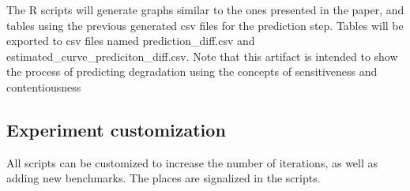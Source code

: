 \documentclass{sigplanconf}
\begin{document}
	The R scripts will generate graphs similar to the ones presented in the paper, and tables
	using the previous generated csv files for the prediction step. Tables will be exported to csv files named
	\textsf{prediction\_diff.csv} and \textsf{estimated\_curve\_prediciton\_diff.csv}.  Note
	that this artifact is intended to show the process of predicting degradation using the
	concepts of sensitiveness and contentiousness
	
	
	\subsection{Experiment customization} 
	
	All scripts can be customized to increase the number of iterations, as well as adding new
	benchmarks. The places are signalized in the scripts.
	
	
	
	
	
	
	
	
\end{document}
